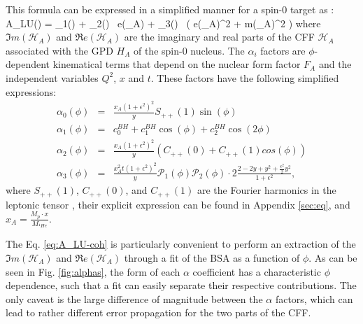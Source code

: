 \documentclass{article}
\let\oldequation\equation
\let\oldendequation\endequation
\renewenvironment{equation}
  {\linenomathNonumbers\oldequation}
  {\oldendequation\endlinenomath}
\begin{document}
This formula can be expressed in a simplified manner for a spin-0 target as \cite{Belitsky:2008bz}:
\begin{equation}
A_{LU}(\phi) = 
{\alpha_{1}(\phi) + \alpha_{2}(\phi) \, \Re e(_{A}) + \alpha_{3}(\phi) \, 
\big( 
\Re e(_{A})^{2} + \Im m(_{A})^{2} \big)}
\label{eq:A_LU-coh}
\end{equation}
where $\Im m(\mathcal{H}_{A})$ and $\Re e(\mathcal{H}_{A})$ are the imaginary 
and real parts of the CFF $\mathcal{H}_{A}$ associated with the GPD $H_A$ of the 
spin-0 nucleus. The 
$\alpha_{i}$ factors are $\phi$-dependent kinematical terms that depend on the 
nuclear form factor $F_A$ and the independent variables $Q^2$, $x$ and $t$.  
These factors have the following simplified expressions:
\begin{eqnarray}
	\label{eq:alpha1}
   \alpha_0 (\phi) & = &\frac{x_{A}(1+\epsilon^2)^2}{y} S_{++}(1) \sin(\phi)\\
    \alpha_1 (\phi) & = & c_0^{BH}+c_1^{BH} \cos({\phi})+c_2^{BH} \cos(2\phi)\\ 
   \alpha_2 (\phi) & = & \frac{x_{A}(1+\epsilon^2)^2}{y}  \left( C_{++}(0) +  
C_{++}(1) cos(\phi) \right)\\
\alpha_3 (\phi) &=& \frac{x^{2}_{A}t(1+\epsilon^2)^2}{y} {\mathcal P}_1(\phi) 
{\mathcal P}_2(\phi) \cdot 2 \frac{2-2y+y^2 + \frac{\epsilon^2}{2}y^2}{1 + 
\epsilon^2},
	\label{eq:alpha4}
\end{eqnarray}
where $S_{++}(1)$, $C_{++}(0)$, and $C_{++}(1)$ are the Fourier harmonics in the 
leptonic tensor \cite{Belitsky:2008bz}, their explicit expression can be found in 
Appendix \ref{sec:eq}, and $x_{A} = \frac{M_{p}\cdot x}{M_{^4\!He}}$. 

The Eq. \ref{eq:A_LU-coh} is particularly convenient to perform an extraction of 
the $\Im m(\mathcal{H}_{A})$ and $\Re e(\mathcal{H}_{A})$ through a fit of the BSA as 
a function of $\phi$. As can be seen in Fig. \ref{fig:alphas}, the form of each 
$\alpha$ coefficient has a characteristic $\phi$ dependence, such that a fit can
easily separate their respective contributions. The only caveat
is the large difference of magnitude between the $\alpha$ factors, which can lead to 
rather different error propagation for the two parts of the CFF.
\end{document}
